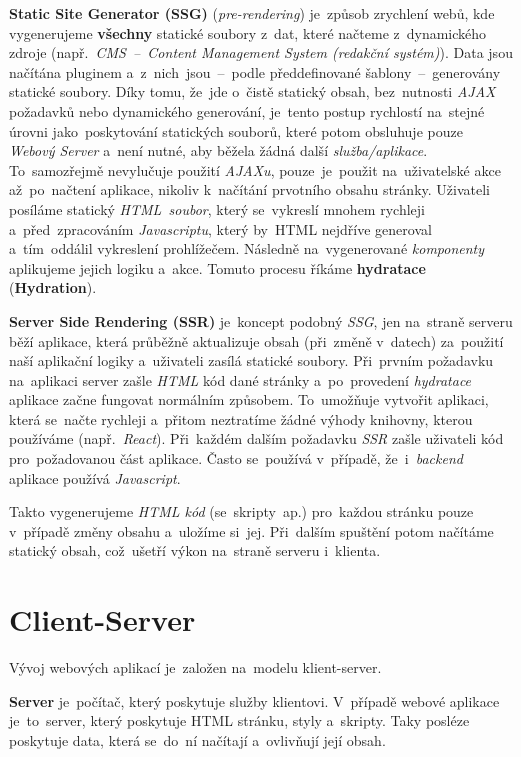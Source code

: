 \documentclass[11pt,a4paper]{report}
\begin{document}
            \textbf{Static Site Generator (SSG)} (\emph{pre-rendering}) je~způsob zrychlení webů, kde vygenerujeme \textbf{všechny} statické soubory z~dat, které načteme z~dynamického zdroje (např.~\emph{CMS~--~Content Management System (redakční systém)}). Data jsou načítána pluginem a~z~nich~jsou~--~podle předdefinované šablony~--~generovány statické soubory. Díky tomu, že~jde o~čistě statický obsah, bez~nutnosti \emph{AJAX} požadavků nebo dynamického generování, je~tento postup rychlostí na~stejné úrovni jako~poskytování statických souborů, které potom obsluhuje pouze \emph{Webový Server} a~není nutné, aby běžela žádná další \emph{služba/aplikace}. To~samozřejmě nevylučuje použití \emph{AJAXu}, pouze~je~použit na~uživatelské akce až~po~načtení aplikace, nikoliv k~načítání prvotního obsahu stránky. Uživateli posíláme statický \emph{HTML~soubor}, který se~vykreslí mnohem rychleji a~před~zpracováním \emph{Javascriptu}, který by~HTML nejdříve generoval a~tím~oddálil vykreslení prohlížečem. Následně na~vygenerované \emph{komponenty} aplikujeme jejich logiku a~akce. Tomuto procesu říkáme \textbf{hydratace} (\textbf{Hydration}).

            \textbf{Server Side Rendering (SSR)} je~koncept podobný \emph{SSG}, jen na~straně serveru běží aplikace, která průběžně aktualizuje obsah (při~změně v~datech) za~použití naší aplikační logiky a~uživateli zasílá statické soubory. Při~prvním požadavku na~aplikaci server zašle \emph{HTML} kód dané stránky a~po~provedení \emph{hydratace} aplikace začne fungovat normálním způsobem. To~umožňuje vytvořit aplikaci, která se~načte rychleji a~přitom neztratíme žádné výhody knihovny, kterou používáme (např.~\emph{React}). Při~každém dalším požadavku \emph{SSR} zašle uživateli kód pro~požadovanou část aplikace. Často se~používá v~případě, že~i~\emph{backend} aplikace používá \emph{Javascript}. \cite{uc:ssrandssg}

            Takto vygenerujeme \emph{HTML kód} (se~skripty~ap.) pro~každou stránku pouze v~případě změny obsahu a~uložíme si~jej. Při~dalším spuštění potom načítáme statický obsah, což~ušetří výkon na~straně serveru i~klienta.

        \section{Client-Server}
            Vývoj webových aplikací je~založen na~modelu klient-server.

            \textbf{Server} je~počítač, který poskytuje služby klientovi. V~případě webové aplikace je~to~server, který poskytuje HTML stránku, styly a~skripty.
            Taky posléze poskytuje data, která se~do~ní načítají a~ovlivňují její obsah.
\end{document}
